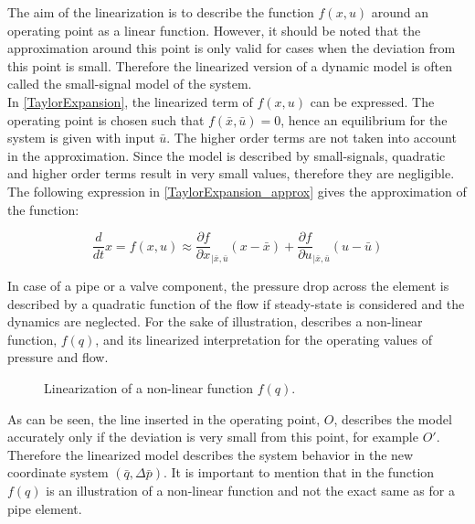 The aim of the linearization is to describe the function $f(x,u)$ around an operating point as a linear function. However, it should be noted that the approximation around this point is only valid for cases when the deviation from this point is small. Therefore the linearized version of a dynamic model is often called the small-signal model of the system. 
\\
In \eqref{TaylorExpansion}, the linearized term of $f(x,u)$ can be expressed. The operating point is chosen such that $f(\bar{x},\bar{u}) = 0$,  hence an equilibrium for the system is given with input $\bar{u}$. The higher order terms are not taken into account in the approximation. Since the model is described by small-signals, quadratic and higher order terms result in very small values, therefore they are negligible. 
\\
The following expression in \eqref{TaylorExpansion_approx} gives the approximation of the function: 

\begin{equation}
\frac{d}{dt} x = f(x,u) \approx \frac{\partial f}{\partial x}_{|\bar{x}, \bar{u}} (x-\bar{x}) + \frac{\partial f}{\partial u}_{|\bar{x}, \bar{u}} (u-\bar{u}) 
 \label{TaylorExpansion_approx}
\end{equation}

In case of a pipe or a valve component, the pressure drop across the element is described by a quadratic function of the flow if steady-state is considered and the dynamics are neglected. For the sake of illustration,  describes a non-linear function, $f(q)$, and its linearized interpretation for the operating values of pressure and flow. 

\begin{figure}[H]
\centering
 
\caption{Linearization of a non-linear function $f(q).$}
\label{fig:linearization}
\end{figure}

As can be seen, the line inserted in the operating point, $O$, describes the model accurately only if the deviation is very small from this point, for example $O'$. Therefore the linearized model describes the system behavior in the new coordinate system $(\bar{q},\Delta \bar{p})$. It is important to mention that in  the function $f(q)$ is an illustration of a non-linear function and not the exact same as for a pipe element. 

